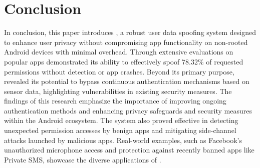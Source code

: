 \section{Conclusion}
\label{sec:conclusion}

In conclusion, this paper introduces \framework{}, a robust user data spoofing system designed to enhance user privacy without compromising app functionality on non-rooted Android devices with minimal overhead. Through extensive evaluations on popular apps \framework{} demonstrated its ability to effectively spoof 78.32\% of requested permissions without detection or app crashes. Beyond its primary purpose, \framework{} revealed its potential to bypass continuous authentication mechanisms based on sensor data, highlighting vulnerabilities in existing security measures. The findings of this research emphasize the importance of improving ongoing authentication methods and enhancing privacy safeguards and security measures within the Android ecosystem. The system also proved effective in detecting unexpected permission accesses by benign apps and mitigating side-channel attacks launched by malicious apps. Real-world examples, such as Facebook's unauthorized microphone access and protection against recently banned apps like Private SMS, showcase the diverse applications of \framework{}.
